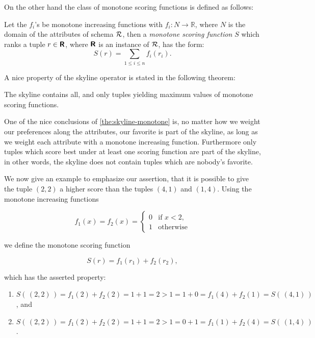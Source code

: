 \bigskip
\noindent
On the other hand the class of monotone scoring functions is defined as follows:

\begin{definition}
Let the $f_i$'s be monotone increasing functions with $f_i\colon N
\rightarrow \mathbb{R}$, where $N$ is the domain of the attributes of
schema $\mathcal{R}$, then a \emph{monotone scoring function} $S$ which
ranks a tuple $r \in \textnormal{\bf\textsf{R}}$, where $\textnormal{\bf\textsf{R}}$ is an instance
of $\mathcal{R}$, has the form:
\[
S(r) = \sum_{1 \le i \le n} f_i(r_i).
\]
\end{definition}

\noindent
A nice property of the skyline operator is stated in the following
theorem:

\begin{theorem}
\label{the:skyline-monotone}
The skyline contains all, and only tuples yielding maximum values of
monotone scoring functions.
\end{theorem}

One of the nice conclusions of \autoref{the:skyline-monotone} is, no
matter how we weight our preferences along the attributes, our
favorite is part of the skyline, as long as we weight each attribute with
a monotone increasing function.  Furthermore only tuples which
score best under at least one scoring function are part of
the skyline, in other words, the skyline does not contain tuples which
are nobody's favorite.


\bigskip
\noindent
We now give an example to emphasize our assertion, that it is possible
to give the tuple $(2,2)$ a higher score than the tuples $(4,1)$ and
$(1,4)$.  Using the monotone increasing functions

\[
f_1(x) = f_2(x) = 
\begin{cases}
0 & \text{if $x < 2$,} \\
1 & \text{otherwise}
\end{cases}
\]

\noindent
we define the monotone scoring function

\[
S(r) = f_1(r_1) + f_2(r_2),
\]

\noindent
which has the asserted property:

\begin{enumerate}
\item
$S(\,(2,2)\,) = f_1(2) + f_2(2) = 1 + 1 = 2 > 1 = 1 + 0 = f_1(4) + f_2(1) = S(\,(4,1)\,)$, and

\item
$S(\,(2,2)\,) = f_1(2) + f_2(2) = 1 + 1 = 2 > 1 = 0 + 1 = f_1(1) + f_2(4) = S(\,(1,4)\,)$.
\end{enumerate}

